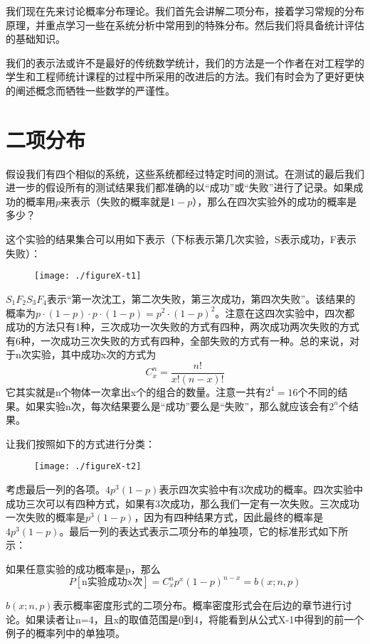 \documentclass[cn,11pt,chinese]{elegantbook}
\begin{document}
{我们现在先来讨论概率分布理论。我们首先会讲解二项分布，接着学习常规的分布原理，并重点学习一些在系统分析中常用到的特殊分布。然后我们将具备统计评估的基础知识。

我们的表示法或许不是最好的传统数学统计，我们的方法是一个作者在对工程学的学生和工程师统计课程的过程中所采用的改进后的方法。我们有时会为了更好更快的阐述概念而牺牲一些数学的严谨性。

\section{二项分布}

假设我们有四个相似的系统，这些系统都经过特定时间的测试。在测试的最后我们进一步的假设所有的测试结果我们都准确的以“成功”或“失败”进行了记录。如果成功的概率用$p$来表示（失败的概率就是$1-p$），那么在四次实验外的成功的概率是多少？

这个实验的结果集合可以用如下表示（下标表示第几次实验，S表示成功，F表示失败）：

\begin{figure}[H]
	\texttt{[image: ./figureX-t1]}
\end{figure}

$S_1F_2S_3F_4$表示“第一次沈工，第二次失败，第三次成功，第四次失败”。该结果的概率为$p\cdot(1-p)\cdot p \cdot (1-p)=p^2\cdot (1-p)^2$。注意在这四次实验中，四次都成功的方法只有1种，三次成功一次失败的方式有四种，两次成功两次失败的方式有6种，一次成功三次失败的方式有四种，全部失败的方式有一种。总的来说，对于n次实验，其中成功x次的方式为
$$
C_x^n=\frac{n!}{x!(n-x)!}$$
它其实就是n个物体一次拿出x个的组合的数量。注意一共有$2^4=16$个不同的结果。如果实验n次，每次结果要么是“成功”要么是“失败”，那么就应该会有$2^n$个结果。

让我们按照如下的方式进行分类：

\begin{figure}[H]
	\texttt{[image: ./figureX-t2]}
\end{figure}

考虑最后一列的各项。$4p^3(1-p)$表示四次实验中有3次成功的概率。四次实验中成功三次可以有四种方式，如果有3次成功，那么我们一定有一次失败。三次成功一次失败的概率是$p^3(1-p)$，因为有四种结果方式，因此最终的概率是$4p^3(1-p)$。最后一列的表达式表示二项分布的单独项，它的标准形式如下所示：

如果任意实验的成功概率是p，那么
\begin{equation}\label{eq10-1}
P[\mbox{n实验成功x次}]=C^n_x p^x(1-p)^{n-x}=b(x;n,p) 
\end{equation}


$b(x;n,p)$表示概率密度形式的二项分布。概率密度形式会在后边的章节进行讨论。如果读者让n=4，且x的取值范围是0到4，将能看到从公式X-1中得到的前一个例子的概率列中的单独项。

}
\end{document}
